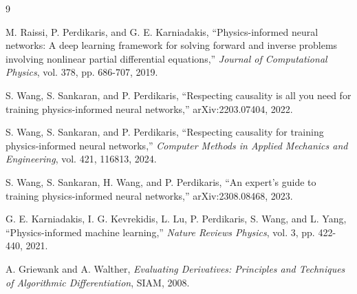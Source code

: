 \documentclass[11pt]{article}
\begin{document}
\begin{thebibliography}{9}

M. Raissi, P. Perdikaris, and G. E. Karniadakis,
``Physics-informed neural networks: A deep learning framework for solving forward and inverse problems involving nonlinear partial differential equations,''
\emph{Journal of Computational Physics}, vol. 378, pp. 686-707, 2019.

S. Wang, S. Sankaran, and P. Perdikaris,
``Respecting causality is all you need for training physics-informed neural networks,''
arXiv:2203.07404, 2022.

S. Wang, S. Sankaran, and P. Perdikaris,
``Respecting causality for training physics-informed neural networks,''
\emph{Computer Methods in Applied Mechanics and Engineering}, vol. 421, 116813, 2024.

S. Wang, S. Sankaran, H. Wang, and P. Perdikaris,
``An expert's guide to training physics-informed neural networks,''
arXiv:2308.08468, 2023.

G. E. Karniadakis, I. G. Kevrekidis, L. Lu, P. Perdikaris, S. Wang, and L. Yang,
``Physics-informed machine learning,''
\emph{Nature Reviews Physics}, vol. 3, pp. 422-440, 2021.

A. Griewank and A. Walther,
\emph{Evaluating Derivatives: Principles and Techniques of Algorithmic Differentiation},
SIAM, 2008.

\end{thebibliography}
\end{document}
